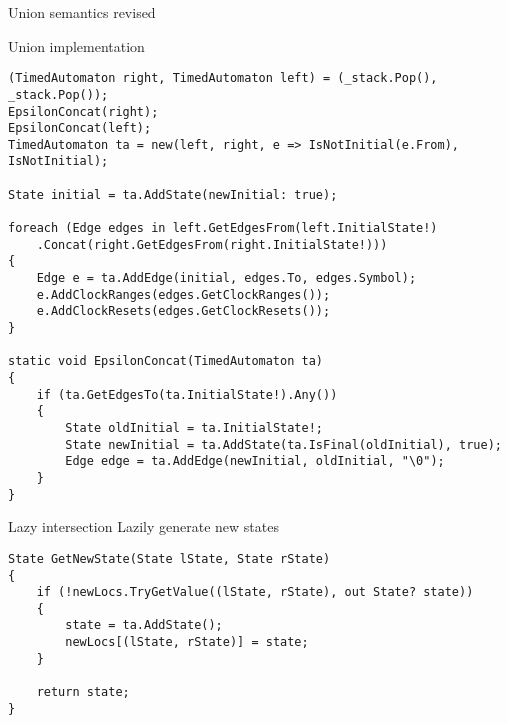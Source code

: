 \begin{frame}{Union semantics revised}
    
\end{frame}

\begin{frame}[fragile]{Union implementation}
    \begin{lstlisting}[style=csharp,basicstyle=\tiny]
(TimedAutomaton right, TimedAutomaton left) = (_stack.Pop(), _stack.Pop());
EpsilonConcat(right);
EpsilonConcat(left);
TimedAutomaton ta = new(left, right, e => IsNotInitial(e.From), IsNotInitial);

State initial = ta.AddState(newInitial: true);

foreach (Edge edges in left.GetEdgesFrom(left.InitialState!)
    .Concat(right.GetEdgesFrom(right.InitialState!)))
{
    Edge e = ta.AddEdge(initial, edges.To, edges.Symbol);
    e.AddClockRanges(edges.GetClockRanges());
    e.AddClockResets(edges.GetClockResets());
}

static void EpsilonConcat(TimedAutomaton ta)
{
    if (ta.GetEdgesTo(ta.InitialState!).Any())
    {
        State oldInitial = ta.InitialState!;
        State newInitial = ta.AddState(ta.IsFinal(oldInitial), true);
        Edge edge = ta.AddEdge(newInitial, oldInitial, "\0");
    }
}
    \end{lstlisting}
\end{frame}

\begin{frame}[fragile]{Lazy intersection}
    Lazily generate new states
    \begin{lstlisting}[style=csharp,basicstyle=\tiny]
State GetNewState(State lState, State rState)
{
    if (!newLocs.TryGetValue((lState, rState), out State? state))
    {
        state = ta.AddState();
        newLocs[(lState, rState)] = state;
    }

    return state;
}
    \end{lstlisting}
\end{frame}

